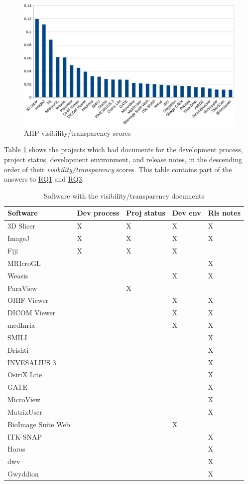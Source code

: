 \begin{figure}[H]
\includegraphics[scale=0.38]{figures/visibility_transparency_scores.png}
\caption{AHP visibility/transparency scores}
\label{fg_visibility_transparency_scores}
\end{figure}

Table \ref{tab_Visibility/Transparency_docs} shows the projects which had documents for the development process, project status, development environment, and release notes, in the descending order of their \textit{visibility/transparency} scores. This table contains part of the answers to \hyperlink{rq1}{RQ1} and \hyperlink{rq3}{RQ3}.

\begin{table}[H]
\centering
\begin{tabular}{lllll}
\hline
Software & Dev process & Proj status & Dev env & Rls notes \\ \hline
3D Slicer & X & X & X & X \\
ImageJ & X & X & X & X \\
Fiji & X & X & X &  \\
MRIcroGL &  &  &  & X \\
Weasis &  &  & X & X \\
ParaView &  & X &  &  \\
OHIF Viewer &  &  & X & X \\
DICOM Viewer &  &  & X & X \\
medInria &  &  & X & X \\
SMILI &  &  &  & X \\
Drishti &  &  &  & X \\
INVESALIUS 3 &  &  &  & X \\
OsiriX Lite &  &  &  & X \\
GATE &  &  &  & X \\
MicroView &  &  &  & X \\
MatrixUser &  &  &  & X \\
BioImage Suite Web &  &  & X &  \\
ITK-SNAP &  &  &  & X \\
Horos &  &  &  & X \\
dwv &  &  &  & X \\
Gwyddion &  &  &  & X \\ \hline
\end{tabular}
\caption{\label{tab_Visibility/Transparency_docs}Software with the visibility/transparency documents}
\end{table}

